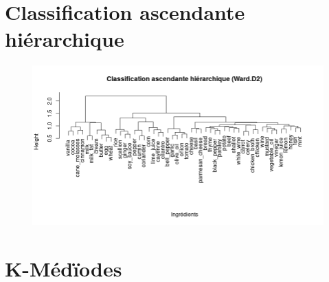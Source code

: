 \documentclass[a4paper, titlepage]{report}
\begin{document}
\section{Classification ascendante hiérarchique}

\begin{figure}[h]
	\begin{center}
		\includegraphics[scale = 0.45]{./doc/plot-hclust-ingredients.png}
	\end{center}
\end{figure}


\section{K-Médïodes}
\end{document}
